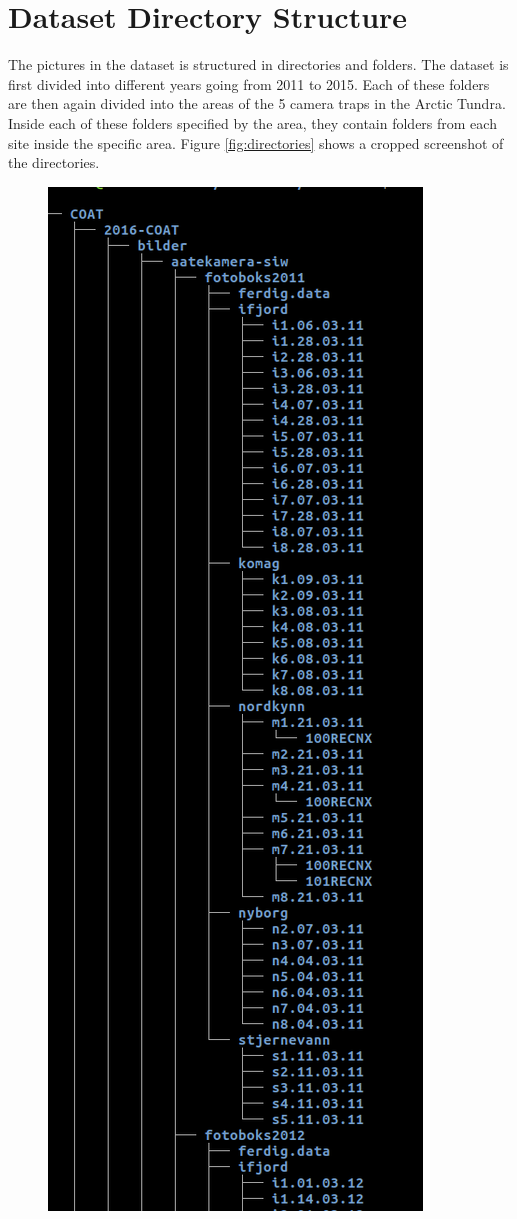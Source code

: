\documentclass[USenglish]{uit-thesis}
\begin{document}
\section{Dataset Directory Structure}
The pictures in the dataset is structured in directories and folders. The dataset is first divided into different years going from 2011 to 2015. Each of these folders are then again divided into the areas of the 5 camera traps in the Arctic Tundra. Inside each of these folders specified by the area, they contain folders from each site inside the specific area. Figure \ref{fig:directories} shows a cropped screenshot of the directories.


\begin{figure}
\centering
\includegraphics[scale=0.5]{directory.png}

\end{figure}
\end{document}
